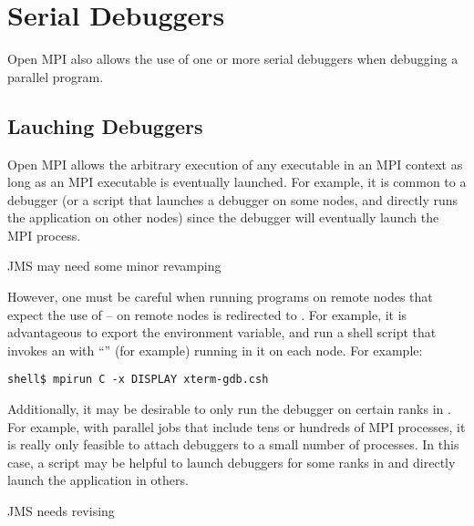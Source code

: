 
\section{Serial Debuggers}
\label{sec:debug-serial}

Open MPI also allows the use of one or more serial debuggers when debugging
a parallel program.  


\subsection{Lauching Debuggers}

Open MPI allows the arbitrary execution of any executable in an MPI
context as long as an MPI executable is eventually launched.  For
example, it is common to  a debugger (or a script that
launches a debugger on some nodes, and directly runs the application
on other nodes) since the debugger will eventually launch the MPI
process.

{\Huge JMS may need some minor revamping}

However, one must be careful when running programs on remote nodes
that expect the use of  --  on remote nodes is
redirected to .  For example, it is advantageous to
export the  environment variable, and run a shell
script that invokes an  with ``'' (for example)
running in it on each node.  For example:

\lstset{style=ompi-cmdline}
\begin{lstlisting}
shell$ mpirun C -x DISPLAY xterm-gdb.csh
\end{lstlisting}

Additionally, it may be desirable to only run the debugger on certain
ranks in \mcw.  For example, with parallel jobs that include tens or
hundreds of MPI processes, it is really only feasible to attach
debuggers to a small number of processes.  In this case, a script may
be helpful to launch debuggers for some ranks in \mcw and directly
launch the application in others.

{\Huge JMS needs revising}


